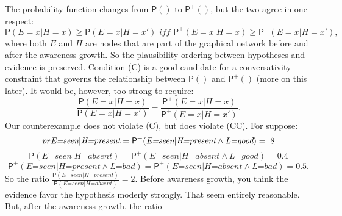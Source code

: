 \documentclass[
  11pt,
  dvipsnames,enabledeprecatedfontcommands]{scrartcl}
\newcommand{\pr}[1]{\ensuremath{\mathsf{P}(#1)}}
\newcommand{\ppr}[2]{\ensuremath{\mathsf{P}^{#1}(#2)}}
\begin{document}
The probability function changes from \(\pr{}\) to \(\ppr{+}{}\), but
the two agree in one respect:
\[\pr{E=x \vert H=x} \geq \pr{E=x \vert H=x'} \textit{ iff } \ppr{+}{E=x \vert H=x} \geq \ppr{+}{E=x \vert H=x'} \tag{C},\]
where both \(E\) and \(H\) are nodes that are part of the graphical
network before and after the awareness growth. So the plausibility
ordering between hypotheses and evidence is preserved. Condition (C) is
a good candidate for a conversativity constraint that governs the
relationship between \(\pr{}\) and \(\ppr{+}{}\) (more on this later).
It would be, however, too strong to require:
\[\frac{\pr{E=x \vert H=x}}{\pr{E=x \vert H=x'}}= \frac{\ppr{+}{E=x \vert H=x}}{\ppr{+}{E=x \vert H=x'}} \tag{CC}.\]
Our counterexample does not violate (C), but does violate (CC). For
suppose:
\[\\pr{\textit{E=seen} \vert \textit{H=present}}=\ppr{+}{\textit{E=seen} \vert \textit{H=present} \wedge \textit{L=good}}=.8\]
\[\pr{\textit{E=seen} \vert \textit{H=absent}}=\ppr{+}{\textit{E=seen} \vert \textit{H=absent} \wedge \textit{L=good}}=0.4\]
\[\ppr{+}{\textit{E=seen} \vert \textit{H=present} \wedge \textit{L=bad}} = \ppr{+}{\textit{E=seen} \vert \textit{H=absent} \wedge \textit{L=bad}}=0.5.\]
So the ratio
\(\frac{\pr{\textit{E=seen} \vert \textit{H=present}}}{\pr{\textit{E=seen} \vert \textit{H=absent}}}=2\).
Before awareness growth, you think the evidence favor the hypothesis
moderly strongly. That seem entirely reasonable. But, after the
awareness growth, the ratio
\end{document}
